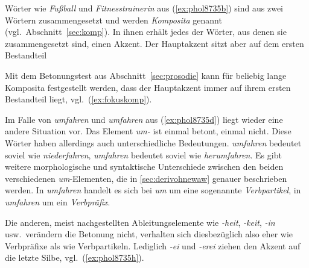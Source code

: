 Wörter wie \textit{Fußball} und \textit{Fitnesstrainerin} aus (\ref{ex:phol8735b}) sind aus zwei Wörtern zusammengesetzt und werden \textit{Komposita} genannt (vgl.\ Abschnitt~\ref{sec:komp}).
In ihnen erhält jedes der Wörter, aus denen sie zusammengesetzt sind, einen Akzent.
Der Hauptakzent sitzt aber auf dem ersten Bestandteil


Mit dem Betonungstest aus Abschnitt~\ref{sec:prosodie} kann für beliebig lange Komposita festgestellt werden, dass der Hauptakzent immer auf ihrem ersten Bestandteil liegt, vgl.\ (\ref{ex:fokuskomp}).

\begin{exe}
  \ex\label{ex:fokuskomp}
  \begin{xlist}
  \end{xlist}
\end{exe}

Im Falle von \textit{\Akz umfahren} und \textit{um\Akz fahren} aus (\ref{ex:phol8735d}) liegt wieder eine andere Situation vor.
Das Element \textit{um-} ist einmal betont, einmal nicht.
Diese Wörter haben allerdings auch unterschiedliche Bedeutungen.
\textit{\Akz umfahren} bedeutet soviel wie \textit{niederfahren}, \textit{um\Akz fahren} bedeutet soviel wie \textit{herumfahren}.
Es gibt weitere morphologische und syntaktische Unterschiede zwischen den beiden verschiedenen \textit{um}-Elementen, die in \ref{sec:derivohnewaw} genauer beschrieben werden.
In \textit{\Akz umfahren} handelt es sich bei \textit{um} um eine sogenannte \textit{Verbpartikel}, in \textit{um\Akz fahren} um ein \textit{Verbpräfix}.


Die anderen, meist nachgestellten Ableitungselemente wie \textit{-heit}, \textit{-keit}, \textit{-in} usw.\ verändern die Betonung nicht, verhalten sich diesbezüglich also eher wie Verbpräfixe als wie Verbpartikeln.
Lediglich \textit{-ei} und \textit{-erei} ziehen den Akzent auf die letzte Silbe, vgl.\ (\ref{ex:phol8735h}).

